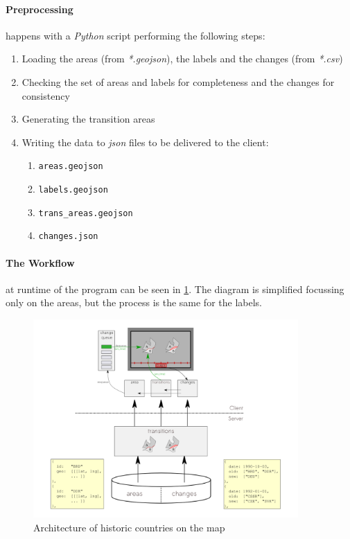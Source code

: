 \vspace{0.5cm}

\paragraph{Preprocessing} happens with a \textit{Python} script performing the following steps:

\begin{enumerate}
  \item Loading the areas (from \textit{*.geojson}), the labels and the changes (from \textit{*.csv})
  \item Checking the set of areas and labels for completeness and the changes for consistency
  \item Generating the transition areas
  \item Writing the data to \textit{json} files to be delivered to the client:
  \begin{enumerate}
    \item \texttt{areas.geojson}
    \item \texttt{labels.geojson}
    \item \texttt{trans\_areas.geojson}
    \item \texttt{changes.json}
  \end{enumerate}
\end{enumerate}

\paragraph{The Workflow}
at runtime of the program can be seen in \ref{fig:historic_changes}. The diagram is simplified focussing only on the areas, but the process is the same for the labels.

\begin{figure}[H]
  \begin{center}
    \includegraphics[width=0.9\textwidth]{graphics/historic_countries.png}
  \end{center}
  \caption{Architecture of historic countries on the map}
  \label{fig:historic_changes}
\end{figure}


